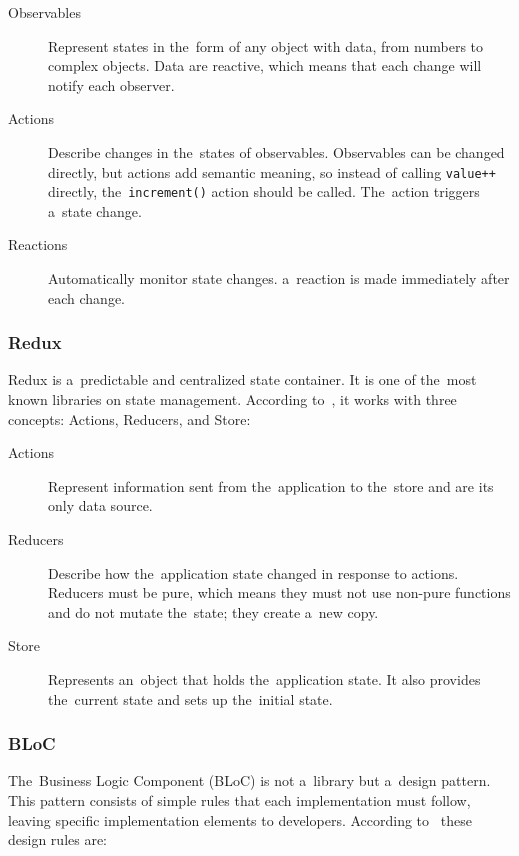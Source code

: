 \begin{description}
    \item[Observables] Represent states in the~form of any object with data, from numbers to complex objects.
    Data are reactive, which means that each change will notify each observer.
    \item[Actions] Describe changes in the~states of observables. Observables can be changed directly, but actions add semantic meaning, so instead of calling \texttt{value++} directly, the~\texttt{increment()} action should be called. The~action triggers a~state change.
    \item[Reactions] Automatically monitor state changes. a~reaction is made immediately after each change.
\end{description}

\subsubsection{Redux}

Redux is a~predictable and centralized state container.
It is one of the~most known libraries on state management.
According to~\cite{brianegan_2021_fluttercommunityreduxdart}, it works with three concepts: Actions, Reducers, and Store:

\begin{description}
    \item[Actions] Represent information sent from the~application to the~store and are its only data source.
    \item[Reducers] Describe how the~application state changed in response to actions.
    Reducers must be pure, which means they must not use non-pure functions and do not mutate the~state; they create a~new copy.
    \item[Store] Represents an~object that holds the~application state.
    It also provides the~current state and sets up the~initial state.
\end{description}

\subsubsection{BLoC}

The~Business Logic Component (BLoC) is not a~library but a~design pattern.
This pattern consists of simple rules that each implementation must follow, leaving specific implementation elements to developers.
According to~\cite{paolosoares_2018_flutter} these design rules are:

